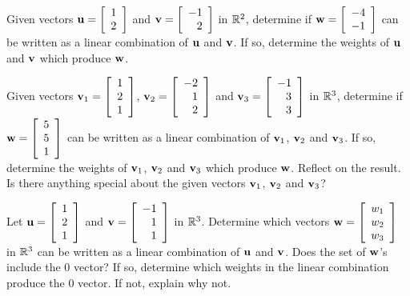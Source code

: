 \label{sec:vec_rep_exer}

\be
\item Given vectors $\mathbf{u}=\left[ \begin{array}{c} 1 \\ 2 \end{array} \right] $ and $\mathbf{v}=\left[ \begin{array}{r} -1 \\ 2 \end{array} \right]$ in $\mathbb{R}^2$, determine if $\mathbf{w}=\left[ \begin{array}{r} -4 \\ -1 \end{array} \right]$ can be written as a linear combination of $\mathbf{u}$ and $\mathbf{v}$. If so, determine the weights of $\mathbf{u}$ and $\mathbf{v}$ which produce $\mathbf{w}$.

\item Given vectors $\mathbf{v}_1=\left[ \begin{array}{c} 1 \\ 2 \\1 \end{array} \right]$, $\mathbf{v}_2=\left[ \begin{array}{r} -2 \\ 1 \\2 \end{array} \right]$ and $\mathbf{v}_3=\left[ \begin{array}{r} -1 \\ 3\\3 \end{array} \right]$ in $\mathbb{R}^3$, determine if $\mathbf{w}=\left[ \begin{array}{c} 5\\ 5\\ 1 \end{array} \right]$ can be written as a linear combination of $\mathbf{v}_1$, $\mathbf{v}_2$ and $\mathbf{v}_3$. If so, determine the weights of $\mathbf{v}_1$, $\mathbf{v}_2$ and $\mathbf{v}_3$ which produce $\mathbf{w}$. Reflect on the result. Is there anything special about the given vectors $\mathbf{v}_1$, $\mathbf{v}_2$ and $\mathbf{v}_3$?

\item Let $\mathbf{u}=\left[ \begin{array}{c} 1 \\ 2 \\1  \end{array} \right] $ and $\mathbf{v}=\left[ \begin{array}{r} -1 \\ 1 \\ 1 \end{array} \right]$ in $\mathbb{R}^3$. Determine which vectors $\mathbf{w}= \left[ \begin{array}{c} w_1 \\ w_2 \\ w_3 \end{array} \right] $ in $\mathbb{R}^3$ can be written as a linear combination of $\mathbf{u}$ and $\mathbf{v}$. Does the set of $\mathbf{w}$'s include the 0 vector? If so, determine which weights in the linear combination produce the 0 vector. If not, explain why not.


